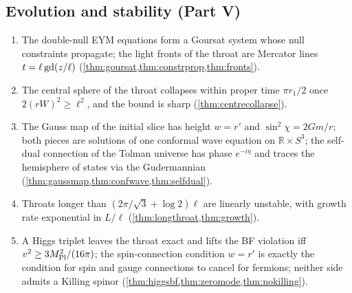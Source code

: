 \subsection*{Evolution and stability (Part V)}
\begin{enumerate}[label=R\arabic*.,leftmargin=*,resume]
\item The double-null EYM equations form a Goursat system whose null constraints propagate; the light fronts of the throat are Mercator lines $t=\ell\operatorname{gd}(z/\ell)$ (\cref{thm:goursat,thm:constrprop,thm:fronts}).
\item The central sphere of the throat collapses within proper time $\pi r_1/2$ once $2(rW)^2\ge\ell^2$, and the bound is sharp (\cref{thm:centrecollapse}).
\item The Gauss map of the initial slice has height $w=r'$ and $\sin^2\chi=2Gm/r$; both pieces are solutions of one conformal wave equation on $\mathbb R\times S^3$; the self-dual connection of the Tolman universe has phase $e^{-i\eta}$ and traces the hemisphere of states via the Gudermannian (\cref{thm:gaussmap,thm:confwave,thm:selfdual}).
\item Throats longer than $(2\pi/\sqrt3+\log2)\ell$ are linearly unstable, with growth rate exponential in $L/\ell$ (\cref{thm:longthroat,thm:growth}).
\item A Higgs triplet leaves the throat exact and lifts the BF violation iff $v^2\ge3M_{\rm Pl}^2/(16\pi)$; the spin-connection condition $w=r'$ is exactly the condition for spin and gauge connections to cancel for fermions; neither side admits a Killing spinor (\cref{thm:higgsbf,thm:zeromode,thm:nokilling}).
\end{enumerate}

